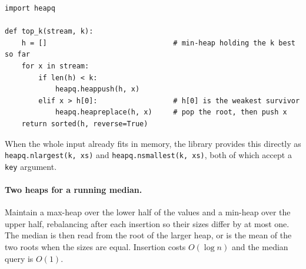 \begin{lstlisting}[style=python, caption={The k largest elements}]
import heapq

def top_k(stream, k):
    h = []                              # min-heap holding the k best so far
    for x in stream:
        if len(h) < k:
            heapq.heappush(h, x)
        elif x > h[0]:                  # h[0] is the weakest survivor
            heapq.heapreplace(h, x)     # pop the root, then push x
    return sorted(h, reverse=True)
\end{lstlisting}

When the whole input already fits in memory, the library provides this
directly as \texttt{heapq.nlargest(k, xs)} and \texttt{heapq.nsmallest(k, xs)},
both of which accept a \texttt{key} argument.

\paragraph{Two heaps for a running median.} Maintain a max-heap over the lower
half of the values and a min-heap over the upper half, rebalancing after each
insertion so their sizes differ by at most one. The median is then read from
the root of the larger heap, or is the mean of the two roots when the sizes
are equal. Insertion costs $O(\log n)$ and the median query is $O(1)$.
